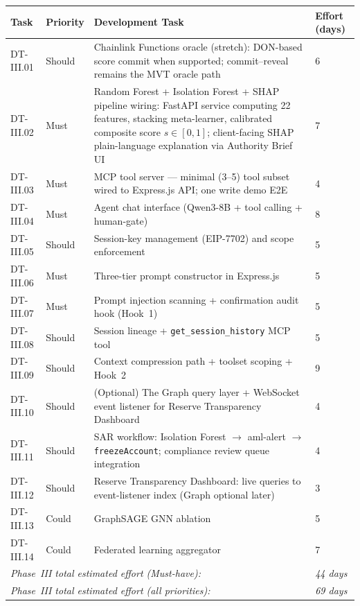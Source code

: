 \documentclass[12pt,a4paper]{report}
\newcommand{\tableheadcolor}{\rowcolor{TableHeadBg}}
\begin{document}
\begin{table}[H]
\centering
\begin{tabular}{p{1.8cm}p{1.8cm}p{7.5cm}p{1.5cm}}
\toprule
\tableheadcolor
\textbf{Task} & \textbf{Priority} & \textbf{Development Task} & \textbf{Effort (days)} \\
\midrule
DT-III.01 & Should & Chainlink Functions oracle (stretch): DON-based score commit when supported; commit--reveal remains the MVT oracle path & 6 \\
DT-III.02 & Must & Random Forest + Isolation Forest + SHAP pipeline wiring: FastAPI service computing 22 features, stacking meta-learner, calibrated composite score $s \in [0,1]$; client-facing SHAP plain-language explanation via Authority Brief UI & 7 \\
DT-III.03 & Must & MCP tool server --- minimal (3--5) tool subset wired to Express.js API; one write demo E2E & 4 \\
DT-III.04 & Must & Agent chat interface (Qwen3-8B + tool calling + human-gate) & 8 \\
DT-III.05 & Should & Session-key management (EIP-7702) and scope enforcement & 5 \\
DT-III.06 & Must & Three-tier prompt constructor in Express.js & 5 \\
DT-III.07 & Must & Prompt injection scanning + confirmation audit hook (Hook~1) & 5 \\
DT-III.08 & Should & Session lineage + \texttt{get\_session\_history} MCP tool & 5 \\
DT-III.09 & Should & Context compression path + toolset scoping + Hook~2 & 9 \\
DT-III.10 & Should & (Optional) The Graph query layer + WebSocket event listener for Reserve Transparency Dashboard & 4 \\
DT-III.11 & Should & SAR workflow: Isolation Forest $\to$ aml-alert $\to$ \texttt{freezeAccount}; compliance review queue integration & 4 \\
DT-III.12 & Should & Reserve Transparency Dashboard: live queries to event-listener index (Graph optional later) & 3 \\
DT-III.13 & Could & GraphSAGE GNN ablation & 5 \\
DT-III.14 & Could & Federated learning aggregator & 7 \\
\multicolumn{3}{l}{\textit{Phase~III total estimated effort (Must-have):}} & \textit{44 days} \\
\multicolumn{3}{l}{\textit{Phase~III total estimated effort (all priorities):}} & \textit{69 days} \\
\bottomrule
\end{tabular}
\end{table}
\end{document}
